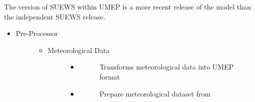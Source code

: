 \documentclass[letterpaper,10pt,english]{sphinxmanual}
\begin{document}
The version of SUEWS within UMEP is a more recent release of the model
than the independent SUEWS release.
\begin{itemize}
\item {} \begin{description}
\item[{Pre-Processor}] \leavevmode\begin{itemize}
\item {} \begin{description}
\item[{Meteorological Data}] \leavevmode\begin{itemize}
\item {} \begin{description}
\item[{}] \leavevmode
Transforms meteorological data into UMEP format

\end{description}

\item {} \begin{description}
\item[{}] \leavevmode
Prepare meteorological dataset from {\hyperref[\detokenize{notation:term-watch}]{}}

\end{description}

\end{itemize}

\end{description}

\end{itemize}

\end{description}

\end{itemize}
\end{document}
